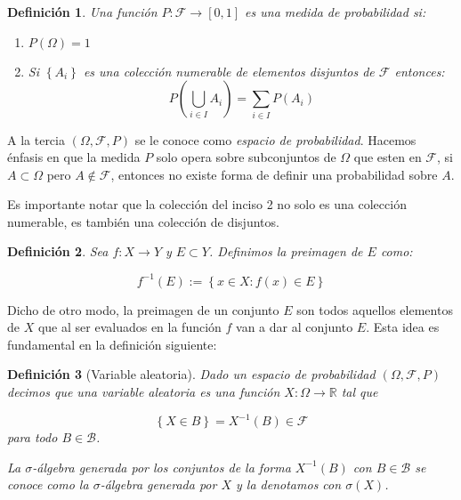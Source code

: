 \documentclass{extreport}
\theoremstyle{definicion}
\newtheorem{definition}{Definición}[chapter]
\theoremstyle{propiedad}
\theoremstyle{teorema}
\begin{document}
\begin{definition}
Una función $P:\mathcal{F}\rightarrow [0,1]$  es una medida de probabilidad si:
\begin{enumerate}
    \item $P(\Omega) = 1$
    \item Si $\left\{A_i\right\}$ es una colección numerable de elementos disjuntos de $\mathcal{F}$ entonces:
    $$
        P\left(\bigcup_{i\in I} A_i\right) =  \sum_{i\in I} P(A_i) 
    $$
\end{enumerate}    
\end{definition}

A la tercia $(\Omega, \mathcal{F}, P)$ se le conoce como \emph{espacio de probabilidad}. Hacemos énfasis en que la medida $P$ solo opera sobre subconjuntos de $\Omega$ que esten en $\mathcal{F}$, si $A\subset \Omega$ pero $A\notin \mathcal{F}$, entonces no existe forma de definir una probabilidad sobre $A$.

Es importante notar que la colección del inciso 2 no solo es una colección numerable, es también una colección de disjuntos. 


\begin{definition}
Sea $f:X\rightarrow Y$ y $E\subset Y$. Definimos la \emph{preimagen}  de $E$ como:

$$
f^{-1}(E) := \left\{x\in X: f(x) \in E\right\}
$$    
\end{definition}
\par\noindent

Dicho de otro modo, la preimagen de un conjunto $E$  son todos aquellos elementos de $X$  que al ser evaluados en la función $f$  van a dar al conjunto $E.$ Esta idea es fundamental en la definición siguiente: 

\begin{definition}[Variable aleatoria]
Dado un espacio de probabilidad $(\Omega, \mathcal{F}, P)$  decimos que una \emph{variable aleatoria} es una función $X:\Omega \rightarrow \mathbb{R}$ tal que 

$$
\left\{X \in B\right\} = X^{-1}(B)\in \mathcal{F}
$$
para todo $B\in \mathcal{B}$. 

La $\sigma$-álgebra generada por los conjuntos de la forma $X^{-1}(B)$ con $B\in\mathcal{B}$ se conoce como la \emph{$\sigma$-álgebra generada por $X$} y la denotamos con $\sigma(X)$.
    
\end{definition}
\end{document}
